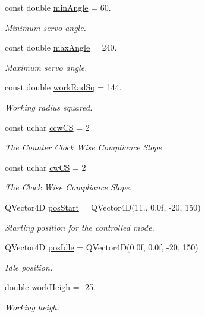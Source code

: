 \begin{DoxyCompactItemize}
const double \hyperlink{a00009_a9af4e0214b1b5c64978bbef49cde6d3c}{min\+Angle} = 60.
\begin{DoxyCompactList}\small\item\em Minimum servo angle. \end{DoxyCompactList}\item 
const double \hyperlink{a00009_a77cc2aed4eff12967e346cb64f6be192}{max\+Angle} = 240.
\begin{DoxyCompactList}\small\item\em Maximum servo angle. \end{DoxyCompactList}\item 
const double \hyperlink{a00009_a4b9e5de00a02c6f77e4308ed209f0cc0}{work\+Rad\+Sq} = 144.
\begin{DoxyCompactList}\small\item\em Working radius squared. \end{DoxyCompactList}\item 
const uchar \hyperlink{a00009_ac2d1087cd0cc45ef71c77aa20b41ceda}{ccw\+C\+S} = 2
\begin{DoxyCompactList}\small\item\em The Counter Clock Wise Compliance Slope. \end{DoxyCompactList}\item 
const uchar \hyperlink{a00009_a67b2528edcaa375aefa1fb4117576665}{cw\+C\+S} = 2
\begin{DoxyCompactList}\small\item\em The Clock Wise Compliance Slope. \end{DoxyCompactList}\item 
Q\+Vector4\+D \hyperlink{a00009_a232fd9d19e8f1be1d42b5801460137c6}{pos\+Start} = Q\+Vector4\+D(11., 0.\+0f, -\/20, 150)
\begin{DoxyCompactList}\small\item\em Starting position for the controlled mode. \end{DoxyCompactList}\item 
Q\+Vector4\+D \hyperlink{a00009_a22328f2a08b4a154a275242ee185aebf}{pos\+Idle} = Q\+Vector4\+D(0.\+0f, 0.\+0f, -\/20, 150)
\begin{DoxyCompactList}\small\item\em Idle position. \end{DoxyCompactList}\item 
double \hyperlink{a00009_a86b38e336a177d6dd31401af98b07172}{work\+Heigh} = -\/25.
\begin{DoxyCompactList}\small\item\em Working heigh. \end{DoxyCompactList}\item 

\end{DoxyCompactItemize}
